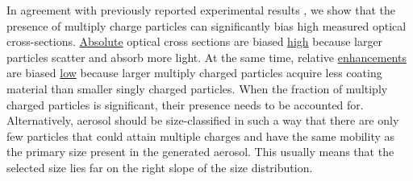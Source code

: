 \documentclass[12pt,authoryear]{elsarticle}
\begin{document}
In agreement with previously reported experimental results \citep{RN7,RN67}, we show that the presence of multiply charge particles can significantly bias high measured optical cross-sections. \underline{Absolute} optical cross sections are biased \underline{high} because larger particles scatter and absorb more light. At the same time, relative \underline{enhancements} are biased \underline{low} because larger multiply charged particles acquire less coating material than smaller singly charged particles. When the fraction of multiply charged particles is significant, their presence needs to be accounted for. Alternatively, aerosol should be size-classified in such a way that there are only few particles that could attain multiple charges and have the same mobility as the primary size present in the generated aerosol. This usually means that the selected size lies far on the right slope of the size distribution.

\end{document}
